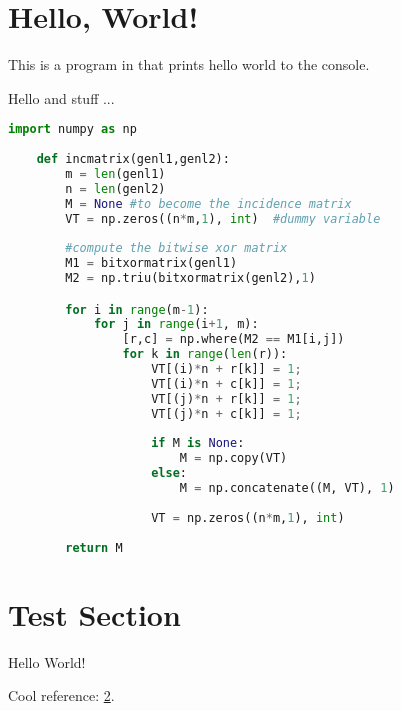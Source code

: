 \documentclass[a4paper, 12pt]{article}
\begin{document}
    
  \pagestyle{frontmatter}
  
  

  \pagestyle{main}
  \section{Hello, World!}

  This is a program in  that prints hello world to the console.

  Hello  and stuff ...

  \begin{lstlisting}[language=Python, caption=Test Code, label=lst:test]
    import numpy as np
        
    def incmatrix(genl1,genl2):
        m = len(genl1)
        n = len(genl2)
        M = None #to become the incidence matrix
        VT = np.zeros((n*m,1), int)  #dummy variable
        
        #compute the bitwise xor matrix
        M1 = bitxormatrix(genl1)
        M2 = np.triu(bitxormatrix(genl2),1) 

        for i in range(m-1):
            for j in range(i+1, m):
                [r,c] = np.where(M2 == M1[i,j])
                for k in range(len(r)):
                    VT[(i)*n + r[k]] = 1;
                    VT[(i)*n + c[k]] = 1;
                    VT[(j)*n + r[k]] = 1;
                    VT[(j)*n + c[k]] = 1;
                    
                    if M is None:
                        M = np.copy(VT)
                    else:
                        M = np.concatenate((M, VT), 1)
                    
                    VT = np.zeros((n*m,1), int)
        
        return M
  \end{lstlisting}

  \section{Test Section}\label{lst:test1}

  \begin{box-top}
    Hello World!

    Cool reference: \ref{lst:test1}.
  \end{box-top}

  \pagestyle{backmatter}
  
  
\end{document}
